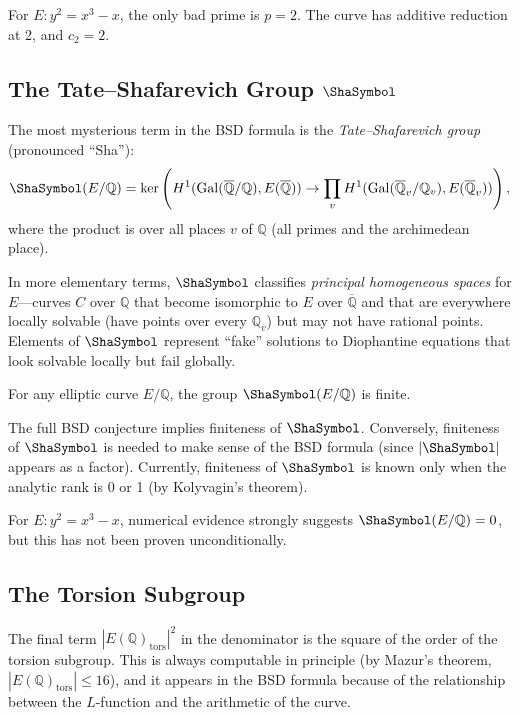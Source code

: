 \begin{example}
For $E: y^2 = x^3 - x$, the only bad prime is $p = 2$. The curve has additive reduction at 2, and $c_2 = 2$.
\end{example}

\subsection{The Tate--Shafarevich Group $\Sha$}

The most mysterious term in the BSD formula is the \emph{Tate--Shafarevich group} (pronounced ``Sha''):
\[
\Sha(E/\mathbb{Q}) = \ker\left(H^1(\Gal(\overline{\mathbb{Q}}/\mathbb{Q}), E(\overline{\mathbb{Q}})) \to \prod_v H^1(\Gal(\overline{\mathbb{Q}}_v/\mathbb{Q}_v), E(\overline{\mathbb{Q}}_v))\right),
\]
where the product is over all places $v$ of $\mathbb{Q}$ (all primes and the archimedean place).

In more elementary terms, $\Sha$ classifies \emph{principal homogeneous spaces} for $E$---curves $C$ over $\mathbb{Q}$ that become isomorphic to $E$ over $\overline{\mathbb{Q}}$ and that are everywhere locally solvable (have points over every $\mathbb{Q}_v$) but may not have rational points. Elements of $\Sha$ represent ``fake'' solutions to Diophantine equations that look solvable locally but fail globally.

\begin{conjecture}
For any elliptic curve $E/\mathbb{Q}$, the group $\Sha(E/\mathbb{Q})$ is finite.
\end{conjecture}

The full BSD conjecture implies finiteness of $\Sha$. Conversely, finiteness of $\Sha$ is needed to make sense of the BSD formula (since $|\Sha|$ appears as a factor). Currently, finiteness of $\Sha$ is known only when the analytic rank is 0 or 1 (by Kolyvagin's theorem).

\begin{example}
For $E: y^2 = x^3 - x$, numerical evidence strongly suggests $\Sha(E/\mathbb{Q}) = 0$, but this has not been proven unconditionally.
\end{example}

\subsection{The Torsion Subgroup}

The final term $|E(\mathbb{Q})_{\mathrm{tors}}|^2$ in the denominator is the square of the order of the torsion subgroup. This is always computable in principle (by Mazur's theorem, $|E(\mathbb{Q})_{\mathrm{tors}}| \le 16$), and it appears in the BSD formula because of the relationship between the $L$-function and the arithmetic of the curve.

